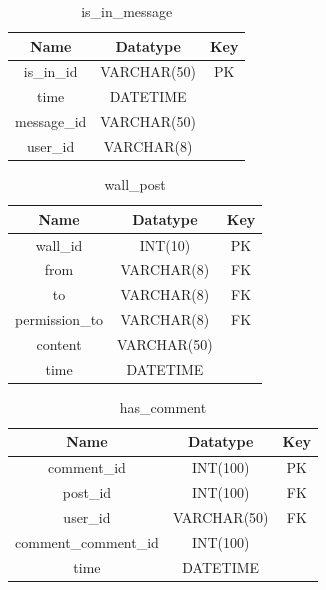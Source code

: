 \begin{table}[!ht]
\caption{is\_in\_message}
\centering
\begin{tabular}{c c c}
\hline\hline
Name               & Datatype        & Key \\
\hline
is\_in\_id         & VARCHAR(50)     & PK  \\
time               & DATETIME        &     \\
message\_id        & VARCHAR(50)     &     \\
user\_id           & VARCHAR(8)      &     \\
\hline
\end{tabular}
\label{table:nonlin}
\end{table}

\begin{table}[!ht]
\caption{wall\_post}
\centering
\begin{tabular}{c c c}
\hline\hline
Name                    & Datatype    & Key \\
\hline
wall\_id                & INT(10)     & PK  \\
from                    & VARCHAR(8)  & FK  \\
to                      & VARCHAR(8)  & FK  \\
permission\_to          & VARCHAR(8)  & FK  \\
content                 & VARCHAR(50) &     \\
time                    & DATETIME    &     \\
\hline
\end{tabular}
\label{table:nonlin}
\end{table}

\begin{table}[!ht]
\caption{has\_comment}
\centering
\begin{tabular}{c c c}
\hline\hline
Name                 & Datatype     & Key \\
\hline
comment\_id          & INT(100)     & PK  \\
post\_id             & INT(100)     & FK  \\
user\_id             & VARCHAR(50)  & FK  \\
comment\_comment\_id & INT(100)     &     \\
time                 & DATETIME     &     \\
\hline
\end{tabular}
\label{table:nonlin}
\end{table}

